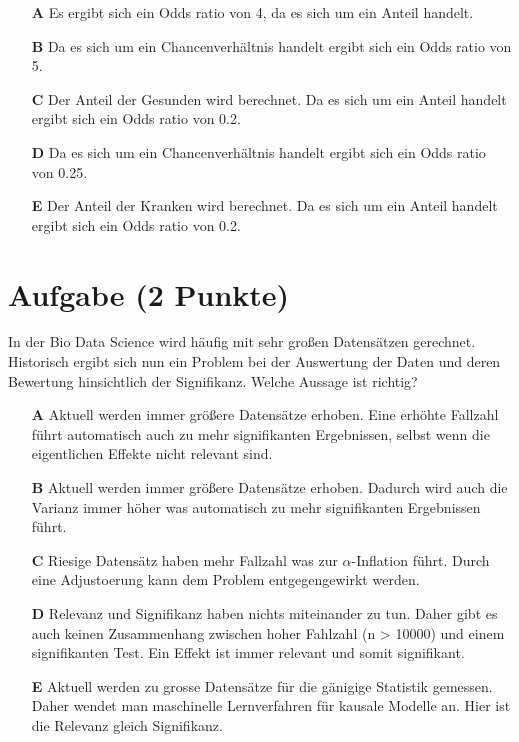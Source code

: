 \documentclass[a4paper, 9pt]{scrartcl}\usepackage[]{graphicx}\usepackage[]{xcolor}
\begin{document}
\begin{enumerate}
\item [\textbf{A} \msquare] Es ergibt sich ein Odds ratio von 4, da es sich um ein Anteil handelt.
\item [\textbf{B} \msquare] Da es sich um ein Chancenverhältnis handelt ergibt sich ein Odds ratio von 5.
\item [\textbf{C} \msquare] Der Anteil der Gesunden wird berechnet. Da es sich um ein Anteil handelt ergibt sich ein Odds ratio von 0.2.
\item [\textbf{D} \msquare] Da es sich um ein Chancenverhältnis handelt ergibt sich ein Odds ratio von 0.25.
\item [\textbf{E} \msquare] Der Anteil der Kranken wird berechnet. Da es sich um ein Anteil handelt ergibt sich ein Odds ratio von 0.2.
\end{enumerate}

\section{Aufgabe \hfill (2 Punkte)}



In der Bio Data Science wird häufig mit sehr großen Datensätzen gerechnet. Historisch ergibt sich nun ein Problem bei der Auswertung der Daten und deren Bewertung hinsichtlich der Signifikanz. Welche Aussage ist richtig?





\begin{enumerate}
\item [\textbf{A} \msquare] Aktuell werden immer größere Datensätze erhoben. Eine erhöhte Fallzahl führt automatisch auch zu mehr signifikanten Ergebnissen, selbst wenn die eigentlichen Effekte nicht relevant sind.
\item [\textbf{B} \msquare] Aktuell werden immer größere Datensätze erhoben. Dadurch wird auch die Varianz immer höher was automatisch zu mehr signifikanten Ergebnissen führt.
\item [\textbf{C} \msquare] Riesige Datensätz haben mehr Fallzahl was zur $\alpha$-Inflation führt. Durch eine Adjustoerung kann dem Problem entgegengewirkt werden.
\item [\textbf{D} \msquare] Relevanz und Signifikanz haben nichts miteinander zu tun. Daher gibt es auch keinen Zusammenhang zwischen hoher Fahlzahl (n > 10000) und einem signifikanten Test. Ein Effekt ist immer relevant und somit signifikant.
\item [\textbf{E} \msquare] Aktuell werden zu grosse Datensätze für die gänigige Statistik gemessen. Daher wendet man maschinelle Lernverfahren für kausale Modelle an. Hier ist die Relevanz gleich Signifikanz.
\end{enumerate}
\end{document}

